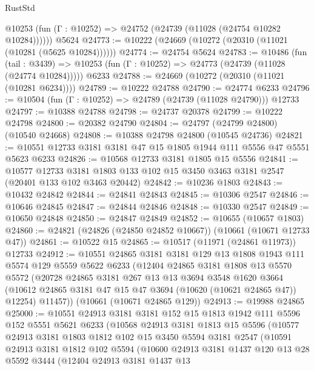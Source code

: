 \begin{lexlean}{RustStd}
\begin{coremodule}
      @10253 (fun (Γ : @10252) => @24752 (@24739 (@11028 (@24754 @10282 @10284))))))
    @5624
@24773 := @10222 (@24669 (@10272 (@20310 (@11021 (@10281 (@5625 @10284))))))
@24774 := @24754 @5624
@24783 := @10486
    (fun (tail : @3439) => @10253 (fun (Γ : @10252) => @24773 (@24739 (@11028 (@24774 @10284)))))
    @6233
@24788 := @24669 (@10272 (@20310 (@11021 (@10281 @6234))))
@24789 := @10222 @24788
@24790 := @24774 @6233
@24796 := @10504 (fun (Γ : @10252) => @24789 (@24739 (@11028 @24790))) @12733
@24797 := @10388 @24788
@24798 := @24737 @20378
@24799 := @10222 @24798
@24800 := @20382 @24790
@24804 := @24797 (@24799 @24800) (@10540 @24668)
@24808 := @10388 @24798 @24800 (@10545 @24736)
@24821 := @10551 @12733 @3181 @3181 @47 @15 @1805 @1944 @111 @5556 @47 @5551 @5623 @6233
@24826 := @10568 @12733 @3181 @1805 @15 @5556
@24841 := @10577
    @12733
    @3181
    @1803
    @133
    @102
    @15
    @3450
    @3463
    @3181
    @2547
    (@20401 @133 @102 @3463 @20442)
@24842 := @10236 @1803
@24843 := @10432 @24842
@24844 := @24841 @24843
@24845 := @10306 @2547
@24846 := @10646 @24845
@24847 := @24844 @24846
@24848 := @10330 @2547
@24849 := @10650 @24848
@24850 := @24847 @24849
@24852 := @10655 (@10657 @1803)
@24860 := @24821 (@24826 (@24850 @24852 @10667)) (@10661 (@10671 @12733 @47))
@24861 := @10522 @15
@24865 := @10517 (@11971 (@24861 @11973)) @12733
@24912 := @10551
    @24865
    @3181
    @3181
    @129
    @13
    @1808
    @1943
    @111
    @5574
    @129
    @5559
    @5622
    @6233
    (@12404
      @24865
      @3181
      @1808
      @13
      @5570
      @5572
      (@20728
        @24865
        @3181
        @267
        @13
        @13
        @3694
        @3548
        @1620
        @3664
        (@10612 @24865 @3181 @47 @15 @47 @3694 (@10620 (@10621 @24865 @47)) @12254)
        @11457))
    (@10661 (@10671 @24865 @129))
@24913 := @19988 @24865
@25000 := @10551
    @24913
    @3181
    @3181
    @152
    @15
    @1813
    @1942
    @111
    @5596
    @152
    @5551
    @5621
    @6233
    (@10568
      @24913
      @3181
      @1813
      @15
      @5596
      (@10577
        @24913
        @3181
        @1803
        @1812
        @102
        @15
        @3450
        @5594
        @3181
        @2547
        (@10591
          @24913
          @3181
          @1812
          @102
          @5594
          (@10600
            @24913
            @3181
            @1437
            @120
            @13
            @28
            @5592
            @3444
            (@12404
              @24913
              @3181
              @1437
              @13

\end{coremodule}
\end{lexlean}

